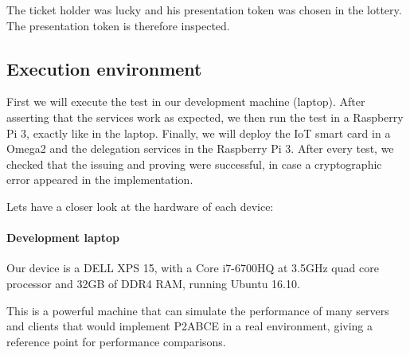The ticket holder was lucky and his presentation token was chosen in the lottery. The presentation token is therefore inspected.


\hfil

\subsection{Execution environment}

First we will execute the test in our development machine (laptop). After asserting that the services work as expected, we then run the test in a Raspberry Pi 3, exactly like in the laptop. Finally, we will deploy the IoT smart card in a Omega2 and the delegation services in the Raspberry Pi 3. After every test, we checked that the issuing and proving were successful, in case a cryptographic error appeared in the implementation. 

Lets have a closer look at the hardware of each device:


\paragraph{Development laptop}
Our device is a DELL XPS 15, with a Core i7-6700HQ at 3.5GHz quad core processor and 32GB of DDR4 RAM, running Ubuntu 16.10.

This is a powerful machine that can simulate the performance of many servers and clients that would implement P2ABCE in a real environment, giving a reference point for performance comparisons.

